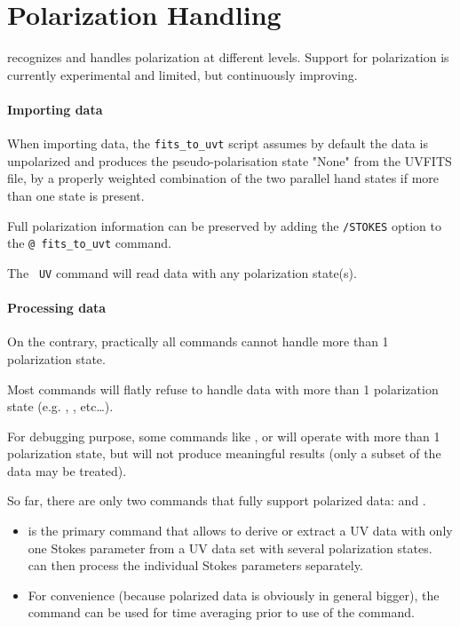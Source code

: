 \section{Polarization Handling}
\label{sec:polar}

\imager{} recognizes and handles polarization at different levels.
Support for polarization is currently experimental and limited, 
but continuously improving.

\paragraph{Importing data}
When importing data, the \texttt{fits\_to\_uvt} script assumes by default
the data is unpolarized and produces the pseudo-polarisation
state "None" from the UVFITS file, by a properly weighted combination
of the two parallel hand states if more than one state is present.

Full polarization information can be preserved by adding the 
\texttt{/STOKES} option to the \texttt{@ fits\_to\_uvt} command. 

The \texttt{ UV} command will read data with any
polarization state(s).

\paragraph{Processing data}
On the contrary, practically all \imager{} commands cannot handle 
more than 1 polarization state. 

Most commands will flatly refuse to handle data with more than 
1 polarization state (e.g. , , etc\ldots).

For debugging purpose, some commands like , 
or  will operate with more than 1 polarization state,
but will not produce meaningful results (only a subset of the data
may be treated).

So far, there are only two commands that fully support polarized
data:  and .
\begin{itemize}
\item {} is the primary command that allows to derive or extract 
a UV data with only one Stokes parameter from a UV data set with 
several polarization states. \imager{} can then process the 
individual Stokes parameters separately.
\item For convenience (because polarized data is obviously in general
bigger), the  command can be used for time averaging
prior to use of the  command.
\end{itemize}

